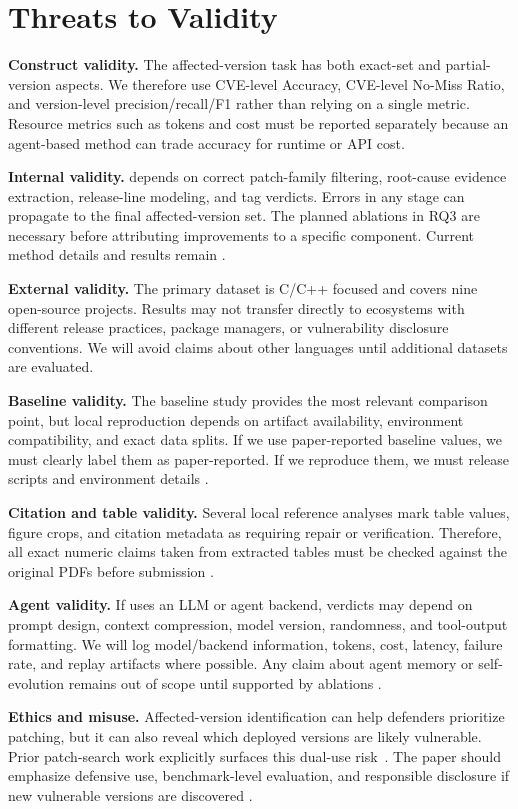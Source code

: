 \section{Threats to Validity}
\label{sec:threats}

\textbf{Construct validity.} The affected-version task has both exact-set and partial-version aspects. We therefore use CVE-level Accuracy, CVE-level No-Miss Ratio, and version-level precision/recall/F1 rather than relying on a single metric. Resource metrics such as tokens and cost must be reported separately because an agent-based method can trade accuracy for runtime or API cost.

\textbf{Internal validity.} \toolname depends on correct patch-family filtering, root-cause evidence extraction, release-line modeling, and tag verdicts. Errors in any stage can propagate to the final affected-version set. The planned ablations in RQ3 are necessary before attributing improvements to a specific component. Current method details and results remain .

\textbf{External validity.} The primary dataset is C/C++ focused and covers nine open-source projects. Results may not transfer directly to ecosystems with different release practices, package managers, or vulnerability disclosure conventions. We will avoid claims about other languages until additional datasets are evaluated.

\textbf{Baseline validity.} The baseline study provides the most relevant comparison point, but local reproduction depends on artifact availability, environment compatibility, and exact data splits. If we use paper-reported baseline values, we must clearly label them as paper-reported. If we reproduce them, we must release scripts and environment details .

\textbf{Citation and table validity.} Several local reference analyses mark table values, figure crops, and citation metadata as requiring repair or verification. Therefore, all exact numeric claims taken from extracted tables must be checked against the original PDFs before submission  .

\textbf{Agent validity.} If \toolname uses an LLM or agent backend, verdicts may depend on prompt design, context compression, model version, randomness, and tool-output formatting. We will log model/backend information, tokens, cost, latency, failure rate, and replay artifacts where possible. Any claim about agent memory or self-evolution remains out of scope until supported by ablations .

\textbf{Ethics and misuse.} Affected-version identification can help defenders prioritize patching, but it can also reveal which deployed versions are likely vulnerable. Prior patch-search work explicitly surfaces this dual-use risk~\cite{redebug2012}. The paper should emphasize defensive use, benchmark-level evaluation, and responsible disclosure if new vulnerable versions are discovered .
